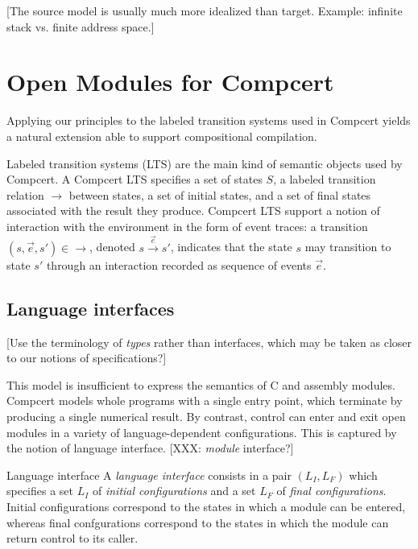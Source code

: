 \documentclass[sigplan,10pt,review,anonymous]{acmart}
\begin{document}
[The source model is usually much more idealized than target.
Example: infinite stack vs. finite address space.]



\section{Open Modules for Compcert} %

Applying our principles to the labeled transition systems
used in Compcert yields a natural extension
able to support compositional compilation.

Labeled transition systems (LTS)
are the main kind of semantic objects used by Compcert.
A Compcert LTS specifies a set of states $S$,
a labeled transition relation ${\rightarrow}$ between states,
a set of initial states,
and a set of final states associated with the result they produce.
Compcert LTS support a notion of interaction with the environment
in the form of event traces:
a transition $(s, \vec{e}, s') \in {\rightarrow}$,
denoted $s \stackrel{\vec{e}}{\rightarrow} s'$,
indicates that the state $s$ may transition to state $s'$
through an interaction recorded as sequence of events $\vec{e}$.

\subsection{Language interfaces} %

[Use the terminology of \emph{types} rather than interfaces,
which may be taken as closer to our notions of specifications?]

This model is insufficient to express
the semantics of C and assembly modules.
Compcert models whole programs with a single entry point,
which terminate by producing a single numerical result.
By contrast,
control can enter and exit open modules
in a variety of language-dependent configurations.
This is captured by the notion of language interface.
[XXX: \emph{module} interface?]

\begin{definition}{Language interface}
A \emph{language interface} consists in a pair $(L_I, L_F)$
which specifies
a set $L_I$ of \emph{initial configurations} and
a set $L_F$ of \emph{final configurations}.
Initial configurations
correspond to the states in which
a module can be entered, whereas
final confgurations
correspond to the states in which
the module can return control
to its caller.
\end{definition}
\end{document}
